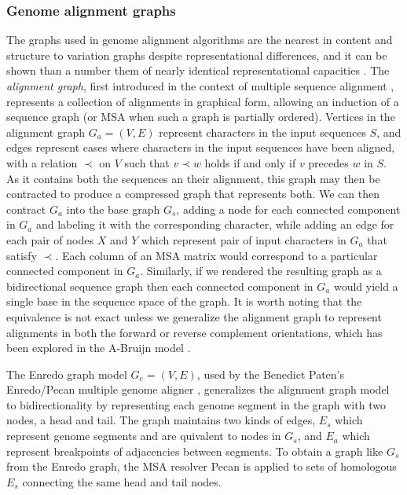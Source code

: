 \subsubsection{Genome alignment graphs}
\label{sec:genome_alignment_graphs}
The graphs used in genome alignment algorithms are the nearest in content and structure to variation graphs despite representational differences, and it can be shown than a number them of nearly identical representational capacities \cite{kehr2014genome}.
The \emph{alignment graph}, first introduced in the context of multiple sequence alignment \cite{kececioglu1993maximum,rausch2008segment}, represents a collection of alignments in graphical form, allowing an induction of a sequence graph (or MSA when such a graph is partially ordered).
Vertices in the alignment graph $G_a = (V, E)$ represent characters in the input sequences $S$, and edges represent cases where characters in the input sequences have been aligned, with a relation $\prec$ on $V$ such that $v \prec w$ holds if and only if $v$ precedes $w$ in $S$.
As it contains both the sequences an their alignment, this graph may then be contracted to produce a compressed graph that represents both.
We can then contract $G_a$ into the base graph $G_s$, adding a node for each connected component in $G_a$ and labeling it with the corresponding character, while adding an edge for each pair of nodes $X$ and $Y$ which represent pair of input characters in $G_a$ that satisfy $\prec$.
Each column of an MSA matrix would correspond to a particular connected component in $G_a$.
Similarly, if we rendered the resulting graph as a bidirectional sequence graph then each connected component in $G_a$ would yield a single base in the sequence space of the graph.
It is worth noting that the equivalence is not exact unless we generalize the alignment graph to represent alignments in both the forward or reverse complement orientations, which has been explored in the A-Bruijn model \cite{raphael2004novel}.

The Enredo graph model $G_e = (V, E)$, used by the Benedict Paten's Enredo/Pecan multiple genome aligner \cite{paten2008enredo}, generalizes the alignment graph model to bidirectionality by representing each genome segment in the graph with two nodes, a head and tail.
The graph maintains two kinds of edges, $E_s$ which represent genome segments and are quivalent to nodes in $G_s$, and $E_a$ which represent breakpoints of adjacencies between segments.
To obtain a graph like $G_s$ from the Enredo graph, the MSA resolver Pecan is applied to sets of homologous $E_s$ connecting the same head and tail nodes.

